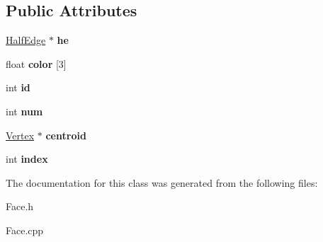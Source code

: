 \subsection*{Public Attributes}
\begin{DoxyCompactItemize}
\item 
\hypertarget{class_face_a59e25df6ddffe19b386a85fbc7707ce9}{\hyperlink{class_half_edge}{Half\-Edge} $\ast$ {\bfseries he}}\label{class_face_a59e25df6ddffe19b386a85fbc7707ce9}

\item 
\hypertarget{class_face_a0bbe61e80b49ac2ef03c28872684f910}{float {\bfseries color} \mbox{[}3\mbox{]}}\label{class_face_a0bbe61e80b49ac2ef03c28872684f910}

\item 
\hypertarget{class_face_afc24894bb86996e7238be7031e4873ac}{int {\bfseries id}}\label{class_face_afc24894bb86996e7238be7031e4873ac}

\item 
\hypertarget{class_face_a611be32896f4bb0d1538ac71853d6efd}{int {\bfseries num}}\label{class_face_a611be32896f4bb0d1538ac71853d6efd}

\item 
\hypertarget{class_face_aeaae042b48ef8a473f26e2aa8d25ece5}{\hyperlink{class_vertex}{Vertex} $\ast$ {\bfseries centroid}}\label{class_face_aeaae042b48ef8a473f26e2aa8d25ece5}

\item 
\hypertarget{class_face_a582933cc37182985c2a39057d99e0894}{int {\bfseries index}}\label{class_face_a582933cc37182985c2a39057d99e0894}

\end{DoxyCompactItemize}


The documentation for this class was generated from the following files\-:\begin{DoxyCompactItemize}
\item 
Face.\-h\item 
Face.\-cpp\end{DoxyCompactItemize}
